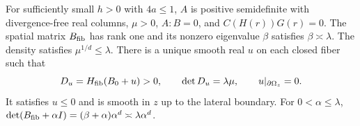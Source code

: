 For sufficiently small $h>0$ with $4a\le1$, $A$ is positive semidefinite with divergence-free real columns, $\mu>0$, $A:B=0$, and $C(H(r))G(r)=0$. The spatial matrix $B_{\rm fib}$ has rank one and its nonzero eigenvalue $\beta$ satisfies $\beta\asymp\lambda$. The density satisfies $\mu^{1/d}\le\lambda$. There is a unique smooth real $u$ on each closed fiber such that
\[
 D_u=H_{\rm fib}(B_0+u)>0,\qquad
 \det D_u=\lambda\mu,\qquad u|_{\partial\Omega_z}=0.
\]
It satisfies $u\le0$ and is smooth in $z$ up to the lateral boundary. For $0<\alpha\le\lambda$,
$\det(B_{\rm fib}+\alpha I)=(\beta+\alpha)\alpha^d\asymp\lambda\alpha^d$.
